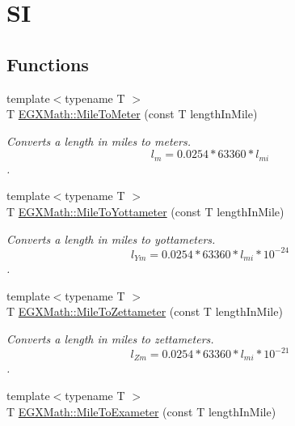 \hypertarget{group___e_g_x_math-_conversions-_length_conversions-_imperial-_mile-_s_i}{}\section{SI}
\label{group___e_g_x_math-_conversions-_length_conversions-_imperial-_mile-_s_i}
\subsection*{Functions}
\begin{DoxyCompactItemize}
\item 
{\footnotesize template$<$typename T $>$ }\\T \mbox{\hyperlink{group___e_g_x_math-_conversions-_length_conversions-_imperial-_mile-_s_i_ga39ebb5e23ea39eb97487dfcd5454c062}{E\+G\+X\+Math\+::\+Mile\+To\+Meter}} (const T length\+In\+Mile)
\begin{DoxyCompactList}\small\item\em Converts a length in miles to meters. \[ l_{m}=0.0254 * 63360 * l_{mi} \]. \end{DoxyCompactList}\item 
{\footnotesize template$<$typename T $>$ }\\T \mbox{\hyperlink{group___e_g_x_math-_conversions-_length_conversions-_imperial-_mile-_s_i_ga26416c1c62f8b0c2cb290f4c984e8a42}{E\+G\+X\+Math\+::\+Mile\+To\+Yottameter}} (const T length\+In\+Mile)
\begin{DoxyCompactList}\small\item\em Converts a length in miles to yottameters. \[ l_{Ym}=0.0254 * 63360 * l_{mi} * 10^{-24} \]. \end{DoxyCompactList}\item 
{\footnotesize template$<$typename T $>$ }\\T \mbox{\hyperlink{group___e_g_x_math-_conversions-_length_conversions-_imperial-_mile-_s_i_ga21202d0625220f09f6f49370f2226054}{E\+G\+X\+Math\+::\+Mile\+To\+Zettameter}} (const T length\+In\+Mile)
\begin{DoxyCompactList}\small\item\em Converts a length in miles to zettameters. \[ l_{Zm}=0.0254 * 63360 * l_{mi} * 10^{-21} \]. \end{DoxyCompactList}\item 
{\footnotesize template$<$typename T $>$ }\\T \mbox{\hyperlink{group___e_g_x_math-_conversions-_length_conversions-_imperial-_mile-_s_i_gaae78957f56d8632cb0edff21dc4e371c}{E\+G\+X\+Math\+::\+Mile\+To\+Exameter}} (const T length\+In\+Mile)

\end{DoxyCompactItemize}
